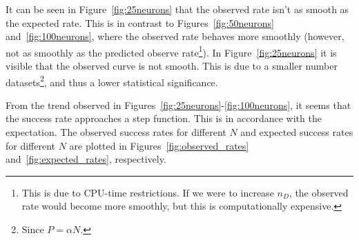 It can be seen in Figure~\ref{fig:25neurons} that the observed rate isn't as smooth as the expected rate.
This is in contrast to Figures~\ref{fig:50neurons} and~\ref{fig:100neurons}, where the observed rate behaves more smoothly (however, not as smoothly as the predicted observe rate\footnote{This is due to CPU-time restrictions. If we were to increase \(n_D\), the observed rate would become more smoothly, but this is computationally expensive.}).
In Figure~\ref{fig:25neurons} it is visible that the observed curve is not smooth. This is due to a smaller number datasets\footnote{Since \(P = \alpha N\).}, and thus a lower statistical significance.

From the trend observed in Figures~\ref{fig:25neurons}-\ref{fig:100neurons}, it seems that the success rate approaches a step function.
This is in accordance with the expectation.
The observed success rates for different \(N\) and expected success rates for different \(N\) are plotted in Figures~\ref{fig:observed_rates} and~\ref{fig:expected_rates}, respectively.

